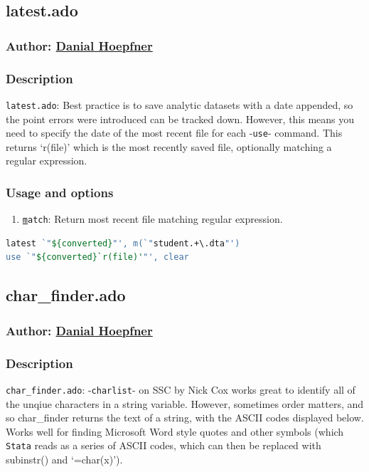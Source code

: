 \documentclass[11pt]{article}
\begin{document}
{\subsection{latest.ado}
\subsubsection{Author: \href{mailto:dhoepfner@gibsonconsult.com}{Danial Hoepfner}}
\subsubsection{Description}
\texttt{latest.ado}: Best practice is to save analytic datasets with a date appended, so the point errors were introduced can be tracked down. However, this means you need to specify the date of the most recent file for each -\texttt{use}- command. This returns `r(file)' which is the most recently saved file, optionally matching a regular expression.
\subsubsection{Usage and options}
\begin{enumerate}
\item \texttt{\underline{m}atch}: Return most recent file matching regular expression.
\end{enumerate}

\begin{lstlisting}[language=Stata, numbers=none]
latest `"${converted}"', m(`"student.+\.dta"')
use `"${converted}`r(file)'"', clear
\end{lstlisting}


\subsection{char\_finder.ado}
\subsubsection{Author: \href{mailto:dhoepfner@gibsonconsult.com}{Danial Hoepfner}}
\subsubsection{Description}
\texttt{char\_finder.ado}: -\texttt{charlist}- on SSC by Nick Cox works great to identify all of the unqiue characters in a string variable. However, sometimes order matters, and so char\_finder returns the text of a string, with the ASCII codes displayed below. Works well for finding Microsoft Word style quotes and other symbols (which \texttt{Stata} reads as a series of ASCII codes, which can then be replaced with subinstr() and `=char(x)').
}
\end{document}
